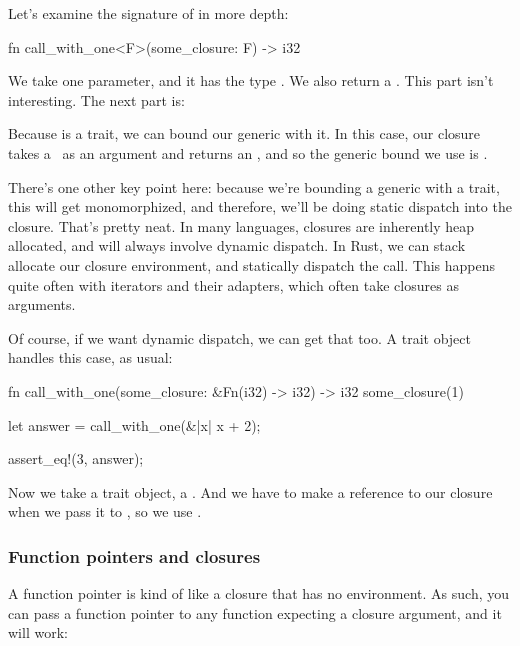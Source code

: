 \blank

Let's examine the signature of  in more depth:

\begin{rustc}
fn call_with_one<F>(some_closure: F) -> i32
\end{rustc}

We take one parameter, and it has the type . We also return a \itt. This part isn't interesting. The next part is:

\begin{rustc}
    where F : Fn(i32) -> i32 {
\end{rustc}

Because  is a trait, we can bound our generic with it. In this case, our closure takes a \itt\ as an argument and returns an 
\itt, and so the generic bound we use is .

\blank

There's one other key point here: because we're bounding a generic with a trait, this will get monomorphized, and therefore, we'll 
be doing static dispatch into the closure. That's pretty neat. In many languages, closures are inherently heap allocated, and will 
always involve dynamic dispatch. In Rust, we can stack allocate our closure environment, and statically dispatch the call. This happens 
quite often with iterators and their adapters, which often take closures as arguments.

\blank

Of course, if we want dynamic dispatch, we can get that too. A trait object handles this case, as usual:

\begin{rustc}
fn call_with_one(some_closure: &Fn(i32) -> i32) -> i32 {
    some_closure(1)
}

let answer = call_with_one(&|x| x + 2);

assert_eq!(3, answer);
\end{rustc}

Now we take a trait object, a . And we have to make a reference to our closure when we pass it to , 
so we use \code{\&||}.

\subsubsection*{Function pointers and closures}

A function pointer is kind of like a closure that has no environment. As such, you can pass a function pointer to any function 
expecting a closure argument, and it will work:

